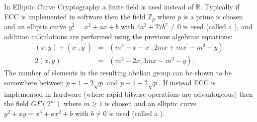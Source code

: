 In Elliptic Curve Cryptography a finite field is used instead of $\mathbb{R}$.
Typically if ECC is implemented in software then the field
$\mathbb{Z}_p$ where $p$ is a prime is chosen and an elliptic curve
$y^2=x^3+ax+b$ with $4a^3+27b^2\neq0$ is used (called a ),
and addition calculations are performed using the previous algebraic equations:
\begin{eqnarray*}
  \left(x,y\right)+\left(x^\prime,y^\prime\right)
    &=& \left(m^2\!-\!x\!-\!x^\prime, 2mx\!+\!mx^\prime\!-\!m^3\!-\!y\right) \\
  2\left(x,y\right) &=& \left(m^2-2x, 3mx-m^3-y\right).
\end{eqnarray*}
The number of elements in the resulting abelian group can be shown to be
somewhere between $p+1-2\sqrt{p}$ and $p+1+2\sqrt{p}$.
If instead ECC is implemented in hardware (where rapid bitwise operations are
advantageous) then the field $GF(2^m)$ where $m\geq1$ is chosen and
an elliptic curve $y^2+xy=x^3+ax^2+b$ with $b\neq0$ is used
(called a ).

